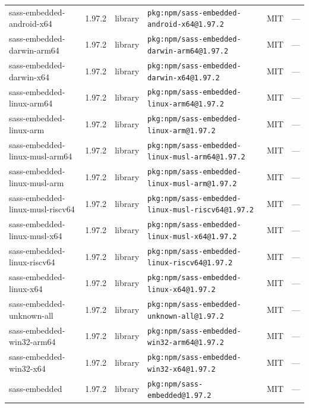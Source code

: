 \documentclass[11pt,a4paper]{article}
\begin{document}
\begin{longtable}{|p{4cm}|p{2cm}|p{1.6cm}|p{5cm}|p{1.5cm}|p{3.5cm}|}
\raggedright sass-embedded-android-x64 & 1.97.2 & library & \small\texttt{pkg:npm/sass-embedded-android-x64@1.97.2} & MIT & \small — \\
\raggedright sass-embedded-darwin-arm64 & 1.97.2 & library & \small\texttt{pkg:npm/sass-embedded-darwin-arm64@1.97.2} & MIT & \small — \\
\raggedright sass-embedded-darwin-x64 & 1.97.2 & library & \small\texttt{pkg:npm/sass-embedded-darwin-x64@1.97.2} & MIT & \small — \\
\raggedright sass-embedded-linux-arm64 & 1.97.2 & library & \small\texttt{pkg:npm/sass-embedded-linux-arm64@1.97.2} & MIT & \small — \\
\raggedright sass-embedded-linux-arm & 1.97.2 & library & \small\texttt{pkg:npm/sass-embedded-linux-arm@1.97.2} & MIT & \small — \\
\raggedright sass-embedded-linux-musl-arm64 & 1.97.2 & library & \small\texttt{pkg:npm/sass-embedded-linux-musl-arm64@1.97.2} & MIT & \small — \\
\raggedright sass-embedded-linux-musl-arm & 1.97.2 & library & \small\texttt{pkg:npm/sass-embedded-linux-musl-arm@1.97.2} & MIT & \small — \\
\raggedright sass-embedded-linux-musl-riscv64 & 1.97.2 & library & \small\texttt{pkg:npm/sass-embedded-linux-musl-riscv64@1.97.2} & MIT & \small — \\
\raggedright sass-embedded-linux-musl-x64 & 1.97.2 & library & \small\texttt{pkg:npm/sass-embedded-linux-musl-x64@1.97.2} & MIT & \small — \\
\raggedright sass-embedded-linux-riscv64 & 1.97.2 & library & \small\texttt{pkg:npm/sass-embedded-linux-riscv64@1.97.2} & MIT & \small — \\
\raggedright sass-embedded-linux-x64 & 1.97.2 & library & \small\texttt{pkg:npm/sass-embedded-linux-x64@1.97.2} & MIT & \small — \\
\raggedright sass-embedded-unknown-all & 1.97.2 & library & \small\texttt{pkg:npm/sass-embedded-unknown-all@1.97.2} & MIT & \small — \\
\raggedright sass-embedded-win32-arm64 & 1.97.2 & library & \small\texttt{pkg:npm/sass-embedded-win32-arm64@1.97.2} & MIT & \small — \\
\raggedright sass-embedded-win32-x64 & 1.97.2 & library & \small\texttt{pkg:npm/sass-embedded-win32-x64@1.97.2} & MIT & \small — \\
\raggedright sass-embedded & 1.97.2 & library & \small\texttt{pkg:npm/sass-embedded@1.97.2} & MIT & \small — \\

\end{longtable}
\end{document}
